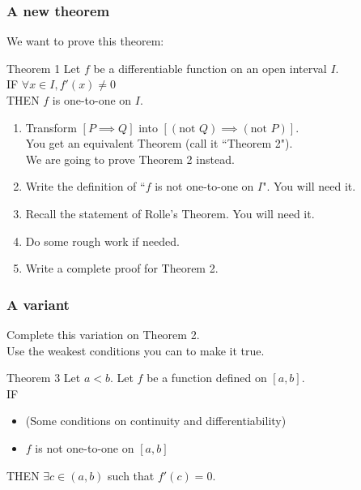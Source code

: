 \begin{frame}[t]
	\fontsize{13}{13}\selectfont
	\frametitle{A new theorem}

	We want to prove this theorem:
	\begin{block}{\fontsize{13}{13}\selectfont Theorem 1}
		Let $f$ be a differentiable function on an open interval $I$. \\ IF
		$\displaystyle \forall x \in I, f'(x) \neq 0$ \\ THEN $f$ is one-to-one on
		$I$.
	\end{block}

	\vfill

	\begin{enumerate}
		\item Transform \quad $\displaystyle [P \implies Q]$ \quad into \quad $\displaystyle
			[(\text{not }Q) \implies (\text{not }P)]$. \\ You get an equivalent
			Theorem (call it ``Theorem 2"). \\ We are going to prove Theorem 2 instead.

		\item Write the definition of ``$f$ is not one-to-one on $I$". You will need
			it.

		\item Recall the statement of Rolle's Theorem. You will need it.

		\item Do some rough work if needed.

		\item Write a complete proof for Theorem 2.
	\end{enumerate}
\end{frame}

\begin{frame}[t]
	\frametitle{A variant}

	Complete this variation on Theorem 2. \\ Use the weakest conditions you can to
	make it true.

	\begin{block}{Theorem 3}
		Let $a<b$. Let $f$ be a function defined on $[a,b]$. \\ IF
		\begin{itemize}
			\item (Some conditions on continuity and differentiability)

			\item $f$ is not one-to-one on $[a,b]$
		\end{itemize}
		THEN $\displaystyle \exists c \in (a,b)$ such that $f'(c)=0$.
	\end{block}
\end{frame}

